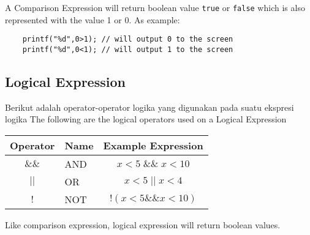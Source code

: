 A Comparison Expression will return boolean value \verb|true| or \verb|false| which is also represented with the value 1 or 0.
As example:
\begin{verbatim}
    printf("%d",0>1); // will output 0 to the screen
    printf("%d",0<1); // will output 1 to the screen 
\end{verbatim}

\subsection{Logical Expression}
Berikut adalah operator-operator logika yang digunakan pada suatu ekspresi logika
The following are the logical operators used on a Logical Expression
\begin{center}
	\begin{tabular}{|c|l|c|}
		\hline
		Operator & \multicolumn{1}{c|}{Name} & Example Expression \\ \hline
		$\&\&$    &  AND                & $x<5\; \&\& \;x<10$\\ \hline
		$||$    &  OR                 & $x < 5\; ||\; x < 4  $     \\ \hline
		$!$        & NOT                & $!(x <5 \&\& x < 10) $\\ \hline
	\end{tabular}
\end{center}
Like comparison expression, logical expression will return boolean values.


